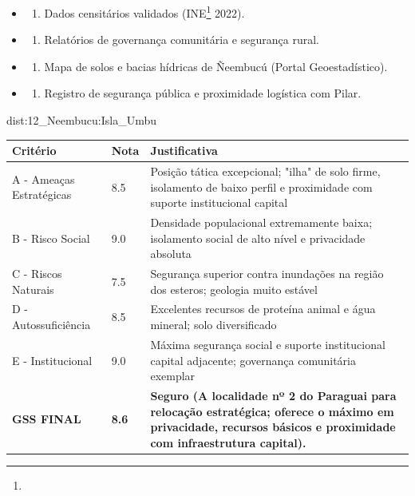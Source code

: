 {\begin{itemize}
\tightlist
\item
  \begin{enumerate}
  \def\labelenumi{\arabic{enumi})}
  \tightlist
  \item
    Dados censitários validados (INE\footnote{\fineINE} 2022).
  \end{enumerate}
\item
  \begin{enumerate}
  \def\labelenumi{\arabic{enumi})}
  \setcounter{enumi}{1}
  \tightlist
  \item
    Relatórios de governança comunitária e segurança rural.
  \end{enumerate}
\item
  \begin{enumerate}
  \def\labelenumi{\arabic{enumi})}
  \setcounter{enumi}{2}
  \tightlist
  \item
    Mapa de solos e bacias hídricas de Ñeembucú (Portal Geoestadístico).
  \end{enumerate}
\item
  \begin{enumerate}
  \def\labelenumi{\arabic{enumi})}
  \setcounter{enumi}{3}
  \tightlist
  \item
    Registro de segurança pública e proximidade logística com Pilar.
  \end{enumerate}
\end{itemize}}{dist:12_Neembucu:Isla_Umbu}
\begin{table}[ht!]
\small \begin{tabular}{p{3.0cm}p{0.8cm}p{6.0cm}} \toprule
\textbf{Critério} & \textbf{Nota} & \textbf{Justificativa} \\ \midrule
A - Ameaças Estratégicas & 8.5 & Posição tática excepcional; "ilha" de solo firme, isolamento de baixo perfil e proximidade com suporte institucional capital \\
B - Risco Social & 9.0 & Densidade populacional extremamente baixa; isolamento social de alto nível e privacidade absoluta \\
C - Riscos Naturais & 7.5 & Segurança superior contra inundações na região dos esteros; geologia muito estável \\
D - Autossuficiência & 8.5 & Excelentes recursos de proteína animal e água mineral; solo diversificado \\
E - Institucional & 9.0 & Máxima segurança social e suporte institucional capital adjacente; governança comunitária exemplar \\
\midrule \textbf{GSS FINAL} & \textbf{8.6} & \textbf{Seguro (A localidade nº 2 do Paraguai para relocação estratégica; oferece o máximo em privacidade, recursos básicos e proximidade com infraestrutura capital).} \\ \bottomrule \end{tabular}
\end{table}

